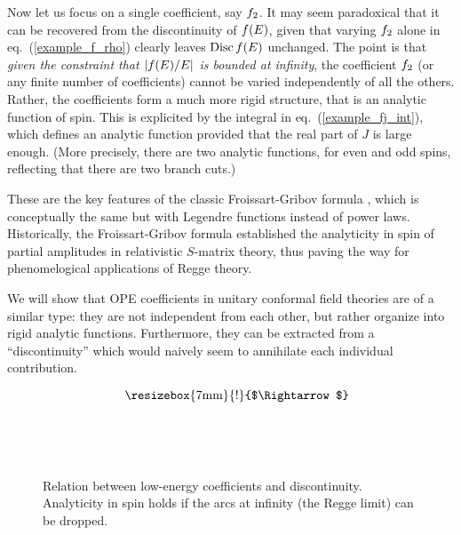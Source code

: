 \documentclass[11pt, reqno,preprint]{article}
\def\be{\begin{equation}}
\def\ee{\end{equation}}
\begin{document}
Now let us focus on a single coefficient, say $f_2$.
It may seem paradoxical that it can be recovered from the discontinuity of $f(E)$,
given that varying $f_2$ alone in eq.~(\ref{example_f_rho}) clearly leaves ${\rm Disc}\,f(E)$ unchanged.
The point is that \emph{given the constraint that $|f(E)/E|$ is bounded at infinity},
the coefficient $f_2$ (or any finite number of coefficients) cannot be varied independently of all the others.
Rather, the coefficients form a much more rigid structure, that is an analytic function of spin.
This is explicited by the integral in eq.~(\ref{example_fj_int}), which defines an analytic function
provided that the real part of $J$ is large enough.
(More precisely, there are two analytic functions, for even and odd spins, reflecting that there are two branch cuts.)

These are the key features of the classic Froissart-Gribov formula \cite{Gribov:1961ex,Collins:1977jy,Donnachie:2002en},
which is conceptually the same but with Legendre functions instead of power laws.
Historically, the Froissart-Gribov formula established the analyticity in spin of partial amplitudes in relativistic $S$-matrix theory,
thus paving the way for phenomelogical applications of Regge theory.

We will show that OPE coefficients in unitary conformal field theories are of a similar type:
they are not independent from each other, but rather organize into rigid analytic functions.
Furthermore, they can be extracted from a ``discontinuity'' which would naively seem to annihilate each individual contribution.

\begin{figure}
\be\begin{array}{cc}
\hspace{0mm}\def\svgwidth{68mm}
& \hspace{6mm}
\raisebox{17mm}{\resizebox{7mm}{!}{$\Rightarrow$}}
\hspace{6mm}\def\svgwidth{68mm}
\end{array}\nonumber\ee
\caption{Relation between low-energy coefficients and discontinuity. Analyticity in spin holds if the arcs at infinity
(the Regge limit) can be dropped.}
\label{fig:Eplane}
\end{figure}
\end{document}
